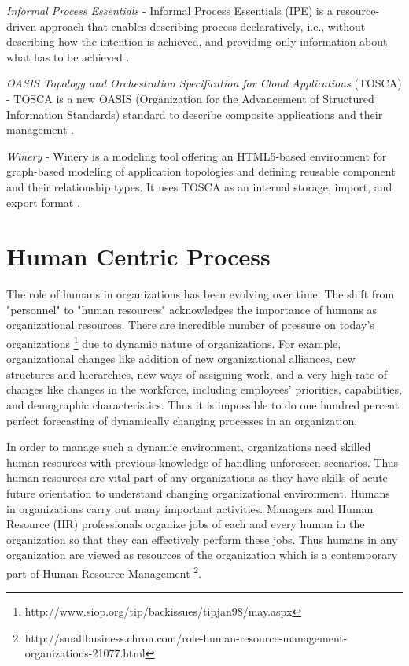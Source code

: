 \textit{Informal Process Essentials} - Informal Process Essentials (IPE) is a resource-driven approach that enables describing process declaratively, i.e., without describing how the intention is achieved, and providing only information about what has to be achieved \cite{Sungur2014a}. 

\textit{OASIS Topology and Orchestration Specification for Cloud Applications} (TOSCA) - TOSCA  is  a  new  OASIS (Organization for the Advancement of Structured Information Standards)  standard  to  describe  composite applications  and  their  management \cite{Kopp2013}.  

\textit{Winery} - Winery is a modeling tool offering an HTML5-based environment for graph-based modeling of application topologies and defining reusable component and their relationship types. It uses TOSCA as an internal storage, import, and export format \cite{Kopp2013}. 

\section{Human Centric Process}
\label{sec:humancentric}
The role of humans in organizations has been evolving over time. The shift from "personnel" to "human resources" acknowledges the importance of humans as organizational resources. There are incredible number of pressure on today's organizations \footnote{http://www.siop.org/tip/backissues/tipjan98/may.aspx} due to dynamic nature of organizations. For example, organizational changes like addition of new organizational alliances, new structures and hierarchies, new ways of assigning work, and a very high rate of changes like changes in the workforce, including employees' priorities, capabilities, and demographic characteristics. Thus it is impossible to do one hundred percent perfect forecasting of dynamically changing processes in an organization.

In order to manage such a dynamic environment, organizations need skilled human resources with previous knowledge of handling unforeseen scenarios. Thus human resources are vital part of any organizations as they have skills of acute future orientation to understand changing organizational environment. Humans in organizations carry out many important activities. Managers and Human Resource (HR) professionals organize jobs of each and every human in the organization so that they can effectively perform these jobs. Thus humans in any organization are viewed as resources of the organization which is a contemporary part of Human Resource Management \footnote{http://smallbusiness.chron.com/role-human-resource-management-organizations-21077.html}.

